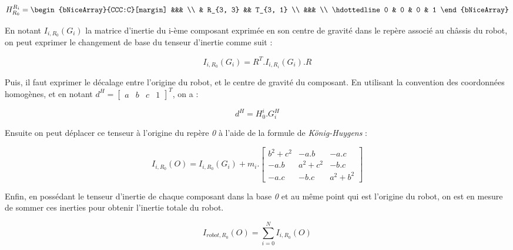 				\begin{equation}
					H_{R_0}^{R_i} = \begin{bNiceArray}{CCC:C}[margin] &&& \\ & R_{3, 3} && T_{3, 1} \\ &&& \\ \hdottedline 0 & 0 & 0 & 1 \end{bNiceArray}
				\end{equation}

				En notant $I_{i, R_0}(G_i)$ la matrice d'inertie du i-ème composant exprimée en son centre de gravité dans le repère associé au châssis du robot, on peut exprimer le changement de base du tenseur d'inertie comme suit :

				\begin{equation}
					I_{i, R_0}(G_i) = R^T.I_{i, R_i}(G_i).R
				\end{equation}

				Puis, il faut exprimer le décalage entre l'origine du robot, et le centre de gravité du composant. En utilisant la convention des coordonnées homogènes, et en notant $d^H = \begin{bmatrix}a & b & c & 1\end{bmatrix}^T$, on a :

				\begin{equation}
					d^H = H_0^i . G_i^H
				\end{equation}

				Ensuite on peut déplacer ce tenseur à l'origine du repère \textit{0} à l'aide de la formule de \textit{König-Huygens} :

				\begin{equation}
					I_{i, R_0}(O) = I_{i, R_0}(G_i) + m_i.\begin{bmatrix} b^2 + c^2 & -a.b & -a.c \\ -a.b & a^2 + c^2 & -b.c \\ -a.c & -b.c & a^2 + b^2 \end{bmatrix}
				\end{equation}

				Enfin, en possédant le tenseur d'inertie de chaque composant dans la base \textit{0} et au même point qui est l'origine du robot, on est en mesure de sommer ces inerties pour obtenir l'inertie totale du robot.

				\begin{equation}
					I_{robot, R_0}(O) = \sum_{i=0}^N I_{i, R_0}(O)
				\end{equation}

